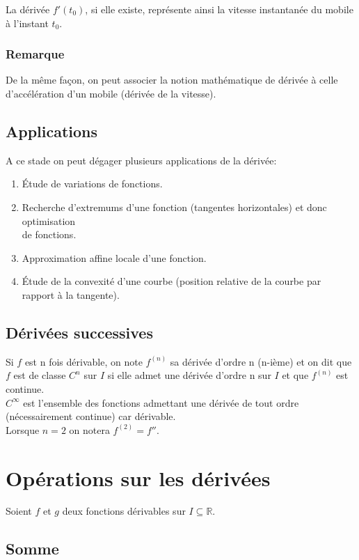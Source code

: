 \documentclass[a4paper,10pt]{book} %
\newcommand{\R}{\mathbb{R}}
\begin{document}
La dérivée $f'(t_{0})$, si elle existe, représente ainsi la vitesse instantanée du mobile à l'instant $t_{0}$.

\subsubsection{Remarque}
De la même façon, on peut associer la notion mathématique de dérivée à celle d'accélération d'un mobile (dérivée de la vitesse).

\subsection{Applications}
A ce stade on peut dégager plusieurs applications de la dérivée:
\begin{enumerate}
\item Étude de variations de fonctions.
\item Recherche d'extremums d'une fonction (tangentes horizontales) et donc optimisation\\
de fonctions.
\item Approximation affine locale d'une fonction.
\item Étude de la convexité d'une courbe (position relative de la courbe par rapport à la tangente).
\end{enumerate}

\subsection{Dérivées successives}
Si $f$ est n fois dérivable, on note $f^{(n)}$ sa dérivée d'ordre n (n-ième) et on dit que $f$ est de classe $C^{n}$ sur $I$ si elle admet une dérivée d'ordre n sur $I$ et que $f^{(n)}$ est continue.\\

$C^{\infty}$ est l'ensemble des fonctions admettant une dérivée de tout ordre (nécessairement continue) car dérivable.\\

Lorsque $n=2$ on notera $f^{(2)}=f''$.

\newpage

\section{Opérations sur les dérivées}
Soient $f$ et $g$ deux fonctions dérivables sur $I\subseteq \R$.
\subsection{Somme}
\end{document}
